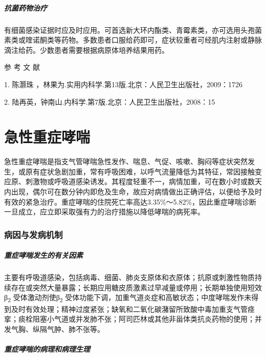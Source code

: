 \paragraph{抗菌药物治疗}

有细菌感染证据时应及时应用。可首选新大环内酯类、青霉素类，亦可选用头孢菌素类或喹诺酮类等药物。多数患者口服给药即可，症状较重者可经肌内注射或静脉滴注给药。少数患者需要根据病原体培养结果用药。

\protect\hypertarget{text00267.html}{}{}

\hypertarget{text00267.htmlux5cux23CHP9-2-4}{}
参 考 文 献

1. 陈灏珠 ，林果为.实用内科学.第13版.北京：人民卫生出版社，2009：1726

2. 陆再英，钟南山.内科学.第7版.北京：人民卫生出版社，2008：15

\protect\hypertarget{text00268.html}{}{}

\chapter{急性重症哮喘}

急性重症哮喘是指支气管哮喘急性发作、喘息、气促、咳嗽、胸闷等症状突然发生，或原有症状急剧加重，常有呼吸困难，以呼气流量降低为其特征，常因接触变应原、刺激物或呼吸道感染诱发。其程度轻重不一，病情加重，可在数小时或数天内出现，偶尔可在数分钟内即危及生命，故应对病情做出正确评估，以便给予及时有效的紧急治疗。重症哮喘的住院死亡率高达3.35\%～5.82\%，因此重症哮喘诊断一旦成立，应立即采取强有力的治疗措施以降低哮喘的病死率。

\subsection{病因与发病机制}

\paragraph{重症哮喘发生的有关因素}

主要有呼吸道感染，包括病毒、细菌、肺炎支原体和衣原体；抗原或刺激性物质持续存在或突然大量暴露；长期应用糖皮质激素过早减量或停用；长期单独使用短效β\textsubscript{2}
受体激动剂使β\textsubscript{2}
受体功能下调，加重气道炎症和高敏状态；中度哮喘发作未得到及时有效处理；精神过度紧张；缺氧和二氧化碳潴留所致酸中毒加重支气管痉挛；痰栓阻塞小气道或并发肺不张；阿司匹林或其他非甾体类抗炎药物的使用；并发气胸、纵隔气肿、肺不张等。

\paragraph{重症哮喘的病理和病理生理}

